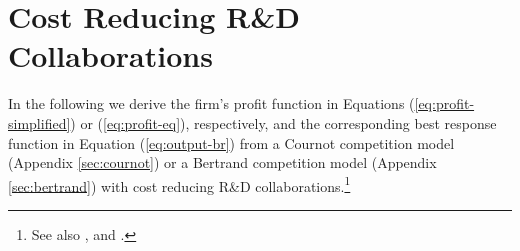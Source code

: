 \FloatBarrier

\section{Cost Reducing R\&D Collaborations}
\label{sec:micro-cost}
In the following we derive the firm's profit function in Equations (\ref{eq:profit-simplified}) or (\ref{eq:profit-eq}), respectively, and the corresponding best response function in Equation (\ref{eq:output-br}) %
from a Cournot competition model (Appendix  \ref{sec:cournot}) or a Bertrand competition model (Appendix \ref{sec:bertrand}) with cost reducing R\&D collaborations.\footnote{See also \citet[][]{goyal01:_r_d_networ}, \citet[][]{Konig2018} and \citet[][]{Hsieh2021}.}

